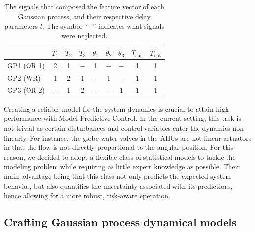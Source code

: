 \begin{table}[!t]
	\small
	\centering
	\begin{tabular}{l|c|c|c|c|c|c|c|c}
		\hline & $T_\text{1}$ & $T_\text{2}$ & $T_\text{3}$ & $\theta_\text{1}$ & $\theta_\text{2}$ & $\theta_\text{3}$ & $T_\text{sup}$ & $T_\text{out}$ \\\hline
		GP1 (OR 1) & 2 & 1 & $-$ & 1 & $-$ & $-$ & 1 & 1 \\
		GP2 (WR) & 1 & 2 & 1 & $-$ & 1 & $-$ & 1 & 1 \\
		GP3 (OR 2) & $-$ & 1 & 2 & $-$ & $-$ & 1 & 1 & 1 \\
		\hline
	\end{tabular}
	\caption{The signals that composed the feature vector of each Gaussian process, and their respective delay parameters $l$. The symbol ``$-$'' indicates what signals were neglected.}
	\label{tab.features}
\end{table}

Creating a reliable model for the system dynamics is crucial to attain high-performance with Model Predictive Control. In the current setting, this task is not trivial as certain disturbances and control variables enter the dynamics non-linearly. For instance, the globe water valves in the AHUs are not linear actuators in that the flow is not directly proportional to the angular position. For this reason, we decided to adopt a flexible class of statistical models to tackle the modeling problem while requiring as little expert knowledge as possible. Their main advantage being that this class not only predicts the expected system behavior, but also quantifies the uncertainty associated with its predictions, hence allowing for a more robust, risk-aware operation.

\subsection{Crafting Gaussian process dynamical models}

